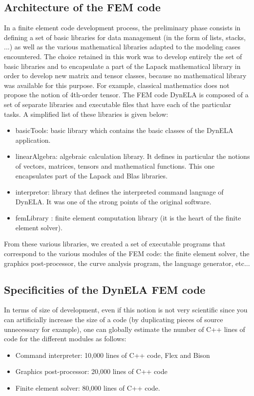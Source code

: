 \subsection{Architecture of the FEM code}

In a finite element code development process, the preliminary phase consists in defining a set of basic libraries for data management (in the form of lists, stacks, ...) as well as the various mathematical libraries adapted to the modeling cases encountered. The choice retained in this work was to develop entirely the set of basic libraries and to encapsulate a part of the Lapack \cite{Lapack:1999} mathematical library in order to develop new matrix and tensor classes, because no mathematical library was available for this purpose. For example, classical mathematics does not propose the notion of 4th-order tensor. The FEM code DynELA is composed of a set of separate libraries and executable files that have each of the particular tasks. A simplified list of these libraries is given below:
\begin{itemize}
\item basicTools: basic library which contains the basic classes of the DynELA application.
\item linearAlgebra: algebraic calculation library. It defines in particular the notions of vectors, matrices, tensors and mathematical functions. This one encapsulates part of the Lapack and Blas libraries.
\item interpretor: library that defines the interpreted command language of DynELA. It was one of the strong points of the original software.
\item femLibrary : finite element computation library (it is the heart of the finite element solver).
\end{itemize}
From these various libraries, we created a set of executable programs that correspond to the various modules of the FEM code: the finite element solver, the graphics post-processor, the curve analysis program, the language generator, etc...

\subsection{Specificities of the DynELA FEM code}
In terms of size of development, even if this notion is not very scientific since you can artificially increase the size of a code (by duplicating pieces of source unnecessary for example), one can globally estimate the number of C++ lines of code for the different modules as follows:
\begin{itemize}
\item Command interpreter: 10,000 lines of C++ code, Flex and Bison \cite{Levine:2009}
\item Graphics post-processor: 20,000 lines of C++ code
\item Finite element solver: 80,000 lines of C++ code.
\end{itemize}

